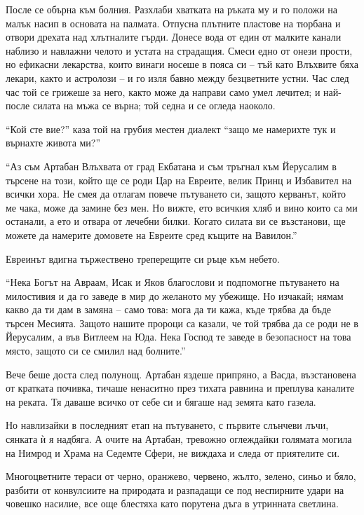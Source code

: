 \documentclass[oneside,10pt]{memoir}
\begin{document}
После се обърна към болния. Разхлаби хватката на ръката му и го положи на малък
насип в основата на палмата. Отпусна плътните пластове на тюрбана и отвори
дрехата над хлътналите гърди. Донесе вода от един от малките канали наблизо и
навлажни челото и устата на страдащия. Смеси едно от онези прости, но ефикасни
лекарства, които винаги носеше в пояса си -- тъй като Влъхвите бяха лекари,
както и астролози -- и го изля бавно между безцветните устни. Час след час той
се грижеше за него, както може да направи само умел лечител; и най-после силата
на мъжа се върна; той седна и се огледа наоколо.

``Кой сте вие?'' каза той на грубия местен диалект ``защо ме намерихте тук и
върнахте живота ми?''

``Аз съм Артабан Влъхвата от град Екбатана и съм тръгнал към Йерусалим в търсене
на този, който ще се роди Цар на Евреите, велик Принц и Избавител на всички
хора. Не смея да отлагам повече пътуването си, защото керванът, който ме чака,
може да замине без мен. Но вижте, ето всичкия хляб и вино които са ми останали,
а ето и отвара от лечебни билки. Когато силата ви се възстанови, ще можете да
намерите домовете на Евреите сред къщите на Вавилон.''

Евреинът вдигна тържествено треперещите си ръце към небето.

``Нека Богът на Авраам, Исак и Яков благослови и подпомогне пътуването на
милостивия и да го заведе в мир до желаното му убежище. Но изчакай; нямам какво
да ти дам в замяна -- само това: мога да ти кажа, къде трябва да бъде търсен
Месията. Защото нашите пророци са казали, че той трябва да се роди не в
Йерусалим, а във Витлеем на Юда. Нека Господ те заведе в безопасност на това
място, защото си се смилил над болните.''

Вече беше доста след полунощ. Артабан яздеше припряно, а Васда, възстановена от
кратката почивка, тичаше ненаситно през тихата равнина и преплува каналите на
реката. Тя даваше всичко от себе си и бягаше над земята като газела.

Но навлизайки в последният етап на пътуването, с първите слънчеви лъчи, сянката
ѝ я надбяга. А очите на Артабан, тревожно оглеждайки голямата могила на Нимрод и
Храма на Седемте Сфери, не виждаха и следа от приятелите си.

Многоцветните тераси от черно, оранжево, червено, жълто, зелено, синьо и бяло,
разбити от конвулсиите на природата и разпадащи се под неспирните удари на
човешко насилие, все още блестяха като порутена дъга в утринната светлина.
\end{document}

